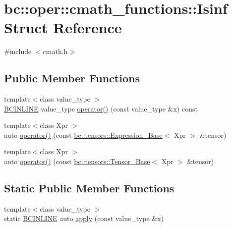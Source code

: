 \hypertarget{structbc_1_1oper_1_1cmath__functions_1_1Isinf}{}\section{bc\+:\+:oper\+:\+:cmath\+\_\+functions\+:\+:Isinf Struct Reference}
\label{structbc_1_1oper_1_1cmath__functions_1_1Isinf}


{\ttfamily \#include $<$cmath.\+h$>$}

\subsection*{Public Member Functions}
\begin{DoxyCompactItemize}
\item 
{\footnotesize template$<$class value\+\_\+type $>$ }\\\hyperlink{common_8h_a6699e8b0449da5c0fafb878e59c1d4b1}{B\+C\+I\+N\+L\+I\+NE} value\+\_\+type \hyperlink{structbc_1_1oper_1_1cmath__functions_1_1Isinf_a665230e22bbb36c3ab950833d8388512}{operator()} (const value\+\_\+type \&x) const
\item 
{\footnotesize template$<$class Xpr $>$ }\\auto \hyperlink{structbc_1_1oper_1_1cmath__functions_1_1Isinf_aa23ead2c5eacba5034712fa484a78aa7}{operator()} (const \hyperlink{classbc_1_1tensors_1_1Expression__Base}{bc\+::tensors\+::\+Expression\+\_\+\+Base}$<$ Xpr $>$ \&tensor)
\item 
{\footnotesize template$<$class Xpr $>$ }\\auto \hyperlink{structbc_1_1oper_1_1cmath__functions_1_1Isinf_a8cb67e39763bf4baee5bca48cde09219}{operator()} (const \hyperlink{classbc_1_1tensors_1_1Tensor__Base}{bc\+::tensors\+::\+Tensor\+\_\+\+Base}$<$ Xpr $>$ \&tensor)
\end{DoxyCompactItemize}
\subsection*{Static Public Member Functions}
\begin{DoxyCompactItemize}
\item 
{\footnotesize template$<$class value\+\_\+type $>$ }\\static \hyperlink{common_8h_a6699e8b0449da5c0fafb878e59c1d4b1}{B\+C\+I\+N\+L\+I\+NE} auto \hyperlink{structbc_1_1oper_1_1cmath__functions_1_1Isinf_ae04f60545b7c574bea771a87b62757b6}{apply} (const value\+\_\+type \&x)
\end{DoxyCompactItemize}


